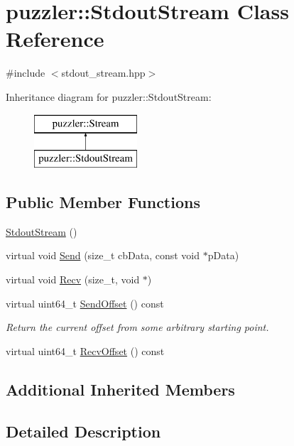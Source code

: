 \hypertarget{a00030}{}\section{puzzler\+:\+:Stdout\+Stream Class Reference}
\label{a00030}


{\ttfamily \#include $<$stdout\+\_\+stream.\+hpp$>$}

Inheritance diagram for puzzler\+:\+:Stdout\+Stream\+:\begin{figure}[H]
\begin{center}
\leavevmode
\includegraphics[height=2.000000cm]{a00030}
\end{center}
\end{figure}
\subsection*{Public Member Functions}
\begin{DoxyCompactItemize}
\item 
\hyperlink{a00030_a48e66bb42f406490bccf4a4fc51dc7f8}{Stdout\+Stream} ()
\item 
virtual void \hyperlink{a00030_a49b08e73ea062862cd78a25ab00aee2a}{Send} (size\+\_\+t cb\+Data, const void $\ast$p\+Data)
\item 
virtual void \hyperlink{a00030_aad641058487bb26cf8555ab14a8d97a9}{Recv} (size\+\_\+t, void $\ast$)
\item 
virtual uint64\+\_\+t \hyperlink{a00030_a9997749cd72a4fabc3510b4b46ae9df1}{Send\+Offset} () const 
\begin{DoxyCompactList}\small\item\em Return the current offset from some arbitrary starting point. \end{DoxyCompactList}\item 
virtual uint64\+\_\+t \hyperlink{a00030_aea7a8080718b7038a1a4cb3e932edd8c}{Recv\+Offset} () const 
\end{DoxyCompactItemize}
\subsection*{Additional Inherited Members}


\subsection{Detailed Description}



